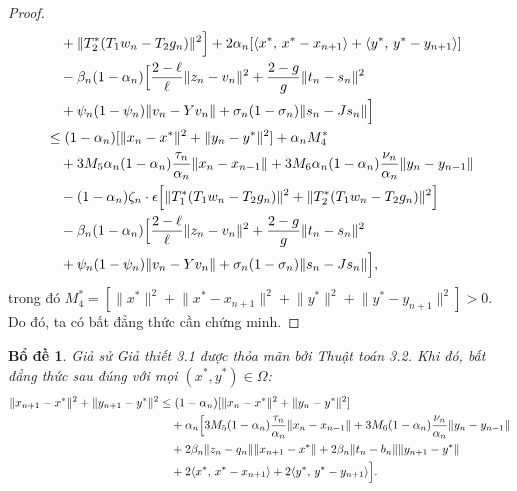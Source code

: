 \documentclass[11pt,a4paper]{article}
\theoremstyle{plain}
\newtheorem{lemma}[theorem]{Bổ đề}
\theoremstyle{definition}
\theoremstyle{remark}
\numberwithin{equation}{section}
\newcommand{\inp}[2]{\langle #1,\,#2\rangle}
\newcommand{\nm}[1]{\lVert #1\rVert}
\begin{document}
\begin{proof}
\begin{align*}
&\quad +\nm{T_2^{*}(T_1w_n-T_2g_n)}^2\Bigr]+2\alpha_n[\inp{x^{*}}{x^{*}-x_{n+1}}+\inp{y^{*}}{y^{*}-y_{n+1}}]\\
&\quad -\beta_n(1-\alpha_n)\Bigl[\frac{2-\ell}{\ell}\nm{z_n-v_n}^2+\frac{2-g}{g}\nm{t_n-s_n}^2\\
&\quad +\psi_n(1-\psi_n)\nm{v_n-Yv_n}+\sigma_n(1-\sigma_n)\nm{s_n-Js_n}\Bigr]\\
&\le (1-\alpha_n)[\nm{x_n-x^{*}}^2+\nm{y_n-y^{*}}^2]+\alpha_n M_4^{*}\\
&\quad +3M_5\alpha_n(1-\alpha_n)\frac{\tau_n}{\alpha_n}\nm{x_n-x_{n-1}}+3M_6\alpha_n(1-\alpha_n)\frac{\nu_n}{\alpha_n}\nm{y_n-y_{n-1}}\\
&\quad -(1-\alpha_n)\zeta_n\cdot\epsilon\Bigl[\nm{T_1^{*}(T_1w_n-T_2g_n)}^2+\nm{T_2^{*}(T_1w_n-T_2g_n)}^2\Bigr]\\
&\quad -\beta_n(1-\alpha_n)\Bigl[\frac{2-\ell}{\ell}\nm{z_n-v_n}^2+\frac{2-g}{g}\nm{t_n-s_n}^2\\
&\quad +\psi_n(1-\psi_n)\nm{v_n-Yv_n}+\sigma_n(1-\sigma_n)\nm{s_n-Js_n}\Bigr],
\end{align*}
trong đó $M_4^{*}=[\nm{x^{*}}^2+\nm{x^{*}-x_{n+1}}^2+\nm{y^{*}}^2+\nm{y^{*}-y_{n+1}}^2]>0$. Do đó, ta có bất đẳng thức cần chứng minh.
\end{proof}

\begin{lemma}\label{lem:4.6}
Giả sử Giả thiết 3.1 được thỏa mãn bởi Thuật toán 3.2. Khi đó, bất đẳng thức sau đúng với mọi $(x^{*},y^{*})\in\Omega$:
\begin{align*}
\nm{x_{n+1}-x^{*}}^2+\nm{y_{n+1}-y^{*}}^2 &\le (1-\alpha_n)[\nm{x_n-x^{*}}^2+\nm{y_n-y^{*}}^2]\\
&\quad +\alpha_n\Bigl[3M_5(1-\alpha_n)\frac{\tau_n}{\alpha_n}\nm{x_n-x_{n-1}}+3M_6(1-\alpha_n)\frac{\nu_n}{\alpha_n}\nm{y_n-y_{n-1}}\\
&\quad +2\beta_n\nm{z_n-q_n}\nm{x_{n+1}-x^{*}}+2\beta_n\nm{t_n-b_n}\nm{y_{n+1}-y^{*}}\\
&\quad +2\inp{x^{*}}{x^{*}-x_{n+1}}+2\inp{y^{*}}{y^{*}-y_{n+1}}\Bigr].
\end{align*}
\end{lemma}
\end{document}
